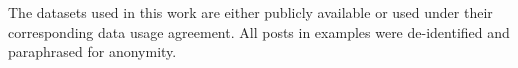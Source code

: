 \documentclass{article}
\begin{document}
The datasets used in this work are either publicly available or used under their corresponding data usage agreement. All posts in examples were de-identified and paraphrased for anonymity.



\end{document}

